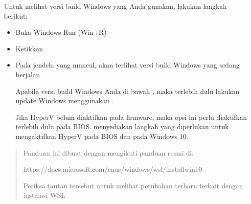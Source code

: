 \documentclass[letterpaper,10pt,english]{sphinxmanual}
\begin{document}
Untuk melihat versi build Windows yang Anda gunakan, lakukan langkah berikut:
\begin{itemize}
\item {} 
Buka Windows Run (Win+R)

\item {} 
Ketikkan 

\item {} 
Pada jendela yang muncul, akan terlihat versi build Windows yang sedang berjalan


Apabila versi build Windows Anda di bawah , maka terlebih dulu lakukan update Windows menggunakan .

Jika Hyper\sphinxhyphen{}V belum diaktifkan pada firmware, maka opsi ini perlu diaktifkan terlebih dulu pada BIOS.  menyediakan langkah yang diperlukan untuk mengaktifkan Hyper\sphinxhyphen{}V pada BIOS dan pada Windows 10.

\end{itemize}
\begin{quote}


Panduan ini dibuat dengan mengikuti panduan resmi di:

https://docs.microsoft.com/en\sphinxhyphen{}us/windows/wsl/install\sphinxhyphen{}win10

Periksa tautan tersebut untuk melihat perubahan terbaru terkait dengan instalasi WSL
\end{quote}
\end{document}
